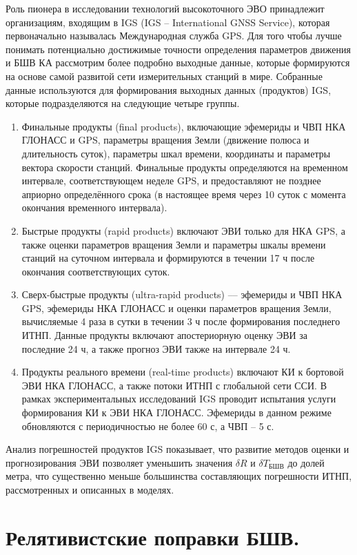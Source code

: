 \documentclass[14pt,a4paper,oneside]{extarticle}
\begin{document}
Роль пионера в исследовании технологий высокоточного ЭВО принадлежит организациям, входящим в IGS (IGS -- International GNSS Service), которая первоначально называлась Международная служба GPS. Для того чтобы лучше понимать потенциально достижимые точности определения параметров движения и БШВ КА рассмотрим более подробно выходные данные, которые формируются на основе самой развитой сети измерительных станций в мире. Собранные данные используются для формирования выходных данных (продуктов) IGS, которые подразделяются на следующие четыре группы.

\begin{enumerate}
    \item Финальные продукты (final products), включающие эфемериды и ЧВП НКА ГЛОНАСС и GPS, параметры вращения Земли (движение полюса и длительность суток), параметры шкал времени, координаты и параметры вектора скорости станций. Финальные продукты определяются на временном интервале, соответствующем неделе GPS, и предоставляют не позднее априорно определённого срока (в настоящее время через 10 суток с момента окончания временного интервала).
    \item Быстрые продукты (rapid products) включают ЭВИ только для НКА GPS, а также оценки параметров вращения Земли и параметры шкалы времени станций на суточном интервала и формируются в течении 17 ч после окончания соответствующих суток.
    \item Сверх-быстрые продукты (ultra-rapid products) –– эфемериды и ЧВП НКА GPS, эфемериды НКА ГЛОНАСС и оценки параметров вращения Земли, вычисляемые 4 раза в сутки в течении 3 ч после формирования последнего ИТНП. Данные продукты включают апостериорную оценку ЭВИ за последние 24 ч, а также прогноз ЭВИ также на интервале 24 ч.
    \item Продукты реального времени (real-time products) включают КИ к бортовой ЭВИ НКА ГЛОНАСС, а также потоки ИТНП с глобальной сети ССИ. В рамках экспериментальных исследований IGS проводит испытания услуги формирования КИ к ЭВИ НКА ГЛОНАСС. Эфемериды в данном режиме обновляются с периодичностью не более 60 с, а ЧВП – 5 с.
\end{enumerate}

Анализ погрешностей продуктов IGS показывает, что развитие методов оценки и прогнозирования ЭВИ позволяет уменьшить значения $\delta R$ и $\delta T_\text{БШВ}$ до долей метра, что существенно меньше большинства составляющих погрешности ИТНП, рассмотренных и описанных в моделях.

\section{Релятивистские поправки БШВ.}
\end{document}
